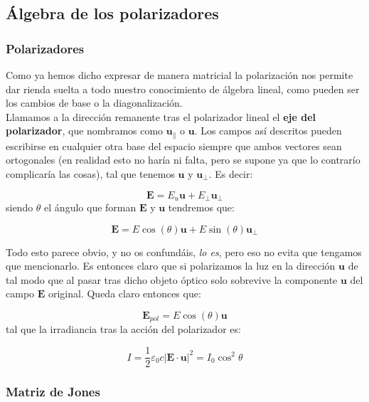 \documentclass[12pt]{article}
\newcommand{\En}{\mathbf{E}}
\newcommand{\un}{\mathbf{u}}
\numberwithin{equation}{section}
\numberwithin{figure}{section}
\begin{document}
\subsection{Álgebra de los polarizadores}

\subsubsection{Polarizadores}

Como ya hemos dicho expresar de manera matricial la polarización nos permite dar rienda suelta a todo nuestro conocimiento de álgebra lineal, como pueden ser los cambios de base o la diagonalización. \\

Llamamos a la dirección remanente tras el polarizador lineal el \textbf{eje del polarizador}, que nombramos como  $\un_\parallel$ o $\un$. Los campos así descritos pueden escribirse en cualquier otra base del espacio siempre que ambos vectores sean ortogonales (en realidad esto no haría ni falta, pero se supone ya que lo contrarío complicaría las cosas), tal que tenemos $\un$ y $\un_\perp$. Es decir:

\begin{equation}
\En = E_u \un  + E_\perp \un_\perp
\end{equation}
siendo $\theta$ el ángulo que forman $\En$ y $\un$ tendremos que:

\begin{equation}
\En = E \cos (\theta) \un + E \sin (\theta ) \un_\perp
\end{equation}

Todo esto parece obvio, y no os confundáis, \textit{lo es}, pero eso no evita que tengamos que mencionarlo. Es entonces claro que si polarizamos la luz en la dirección $\un$ de tal modo que al pasar tras dicho objeto óptico solo sobrevive la componente $\un$ del campo $\En$ original. Queda claro entonces que:

\begin{equation}
\En_{pol} = E \cos (\theta) \un
\end{equation}
tal que la irradiancia tras la acción del polarizador es:

\begin{equation}
I = \dfrac{1}{2} \varepsilon_0 c |\En \cdot \un |^2 = I_0 \cos^2 \theta
\end{equation}

\subsubsection{Matriz de Jones}
\end{document}
